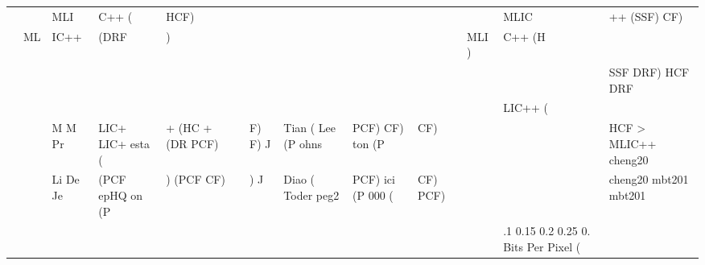 \begin{tabular}{lllllllllllll}
 &  & MLI & C++ ( & HCF) &  &  &  &  &  &  & MLIC & ++ (SSF) CF) \\
 & ML & IC++ & (DRF & ) &  &  &  &  &  & MLI ) & C++ (H &  \\
 &  &  &  &  &  &  &  &  &  &  &  & SSF DRF) HCF DRF \\
 &  &  &  &  &  &  &  &  &  &  & LIC++ ( &  \\
 &  & M M Pr & LIC+ LIC+ esta ( & + (HC + (DR PCF) &  & F) F) J & Tian ( Lee (P ohns & PCF) CF) ton (P & CF) &  &  & HCF > MLIC++ cheng20 \\
 &  & Li De Je & (PCF epHQ on (P & ) (PCF CF) &  & ) J & Diao ( Toder peg2 & PCF) ici (P 000 ( & CF) PCF) &  &  & cheng20 mbt201 mbt201 \\
 &  &  &  &  &  &  &  &  &  &  & .1 0.15 0.2 0.25 0. Bits Per Pixel ( &  \\
\bottomrule
\end{tabular}
